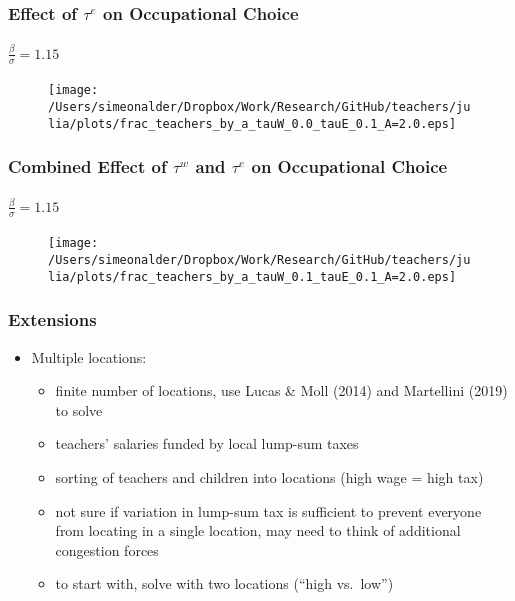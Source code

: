 \documentclass[11pt]{beamer}
\begin{document}
\begin{frame}
\frametitle{Effect of $\tau^e$ on Occupational Choice}
\framesubtitle{$\frac{\beta}{\sigma} = 1.15$}
\begin{figure}
\begin{center}
\texttt{[image: /Users/simeonalder/Dropbox/Work/Research/GitHub/teachers/julia/plots/frac\_teachers\_by\_a\_tauW\_0.0\_tauE\_0.1\_A=2.0.eps]}
\end{center}
\end{figure}
\end{frame}

\begin{frame}
\frametitle{Combined Effect of $\tau^w$ and $\tau^e$ on Occupational Choice}
\framesubtitle{$\frac{\beta}{\sigma} = 1.15$}
\begin{figure}
\begin{center}
\texttt{[image: /Users/simeonalder/Dropbox/Work/Research/GitHub/teachers/julia/plots/frac\_teachers\_by\_a\_tauW\_0.1\_tauE\_0.1\_A=2.0.eps]}
\end{center}
\end{figure}
\end{frame}

\begin{frame}
\frametitle{Extensions}
\begin{itemize}
  \item Multiple locations:
  \begin{itemize}
  \item finite number of locations, use Lucas \& Moll (2014) and Martellini (2019) to solve
  \item teachers' salaries funded by local lump-sum taxes
  \item sorting of teachers and children into locations (high wage = high tax)
  \item not sure if variation in lump-sum tax is sufficient to prevent everyone from locating in a single location, may need to think of additional congestion forces
  \item to start with, solve with two locations (``high vs.~low'') 
  \end{itemize}
\end{itemize}
\end{frame}
\end{document}
